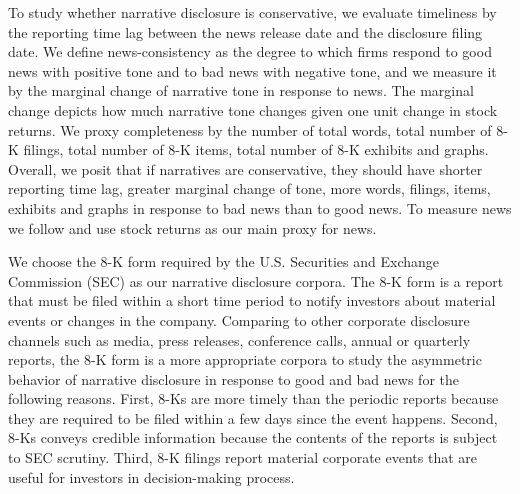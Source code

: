 \documentclass[letterpaper,12pt]{article}
\begin{document}
\begin{spacing}{1.5}
To study whether narrative disclosure is conservative, we evaluate timeliness by the reporting time lag between the news release date and the disclosure filing date. We define news-consistency as the degree to which firms respond to good news with positive tone and to bad news with negative tone, and we measure it by the marginal change of narrative tone in response to news. The marginal change depicts how much narrative tone changes given one unit change in stock returns. We proxy completeness by the number of total words, total number of 8-K filings, total number of 8-K items, total number of 8-K exhibits and graphs. 
Overall, we posit that if narratives are conservative, they should have shorter reporting time lag, greater marginal change of tone, more words, filings, items, exhibits and graphs in response to bad news than to good news. To measure news we follow  and use stock returns as our main proxy for news.

We choose the 8-K form required by the U.S. Securities and Exchange Commission (SEC) as our narrative disclosure corpora. The 8-K form is a report that must be filed within a short time period to notify investors about material events or changes in the company. Comparing to other corporate disclosure channels such as media, press releases, conference calls, annual or quarterly reports, the 8-K form is a more appropriate corpora to study the asymmetric behavior of narrative disclosure in response to good and bad news for the following reasons. First, 8-Ks are more timely than the periodic reports because they are required to be filed within a few days since the event happens. Second, 8-Ks conveys credible information because the contents of the reports is subject to SEC scrutiny. Third, 8-K filings report material corporate events that are useful for investors in decision-making process.


\end{spacing}
\end{document}
